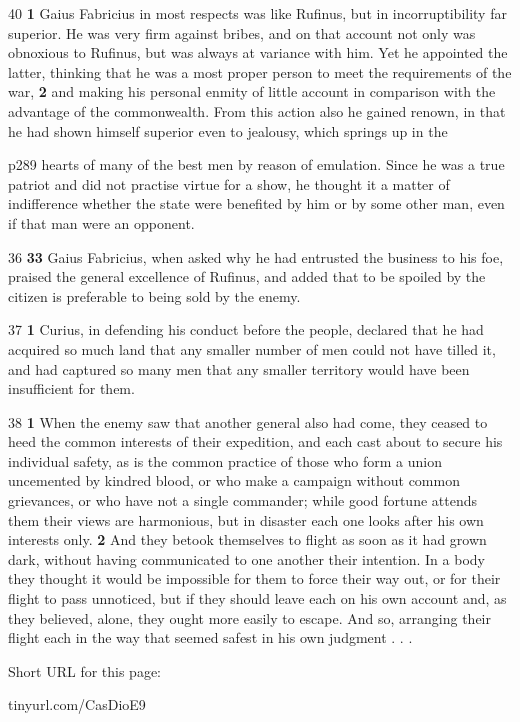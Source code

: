 40
\textbf{1} Gaius Fabricius in most respects was like Rufinus, but in incorruptibility far superior. He was very firm against bribes, and on that account not only was obnoxious to Rufinus, but was always at variance with him. Yet he appointed the latter, thinking that he was a most proper person to meet the requirements of the war, \textbf{2} and making his personal enmity of little account in comparison with the advantage of the commonwealth. From this action also he gained renown, in that he had shown himself superior even to jealousy, which springs up in the

p289 hearts of many of the best men by reason of emulation. Since he was a true patriot and did not practise virtue for a show, he thought it a matter of indifference whether the state were benefited by him or by some other man, even if that man were an opponent.

36
\textbf{33} Gaius Fabricius, when asked why he had entrusted the business to his foe, praised the general excellence of Rufinus, and added that to be spoiled by the citizen is preferable to being sold by the enemy.

37
\textbf{1} Curius, in defending his conduct before the people, declared that he had acquired so much land that any smaller number of men could not have tilled it, and had captured so many men that any smaller territory would have been insufficient for them.

38
\textbf{1} When the enemy saw that another general also had come, they ceased to heed the common interests of their expedition, and each cast about to secure his individual safety, as is the common practice of those who form a union uncemented by kindred blood, or who make a campaign without common grievances, or who have not a single commander; while good fortune attends them their views are harmonious, but in disaster each one looks after his own interests only. \textbf{2} And they betook themselves to flight as soon as it had grown dark, without having communicated to one another their intention. In a body they thought it would be impossible for them to force their way out, or for their flight to pass unnoticed, but if they should leave each on his own account and, as they believed, alone, they ought more easily to escape. And so, arranging their flight each in the way that seemed safest in his own judgment . . .


Short URL for this page:

tinyurl.com/CasDioE9

